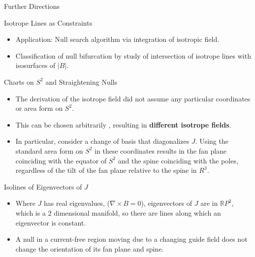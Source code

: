 \documentclass[final]{beamer}
\newlength{\sepwid}
\newlength{\onecolwid}
\newlength{\twocolwid}
\begin{document}
\begin{frame}[t]
\begin{columns}[t]
\begin{column}{\twocolwid}



\begin{columns}[t,totalwidth=\twocolwid]

\begin{column}{\onecolwid} %
\begin{block}{\huge Further Directions}
  \begin{block}{Isotrope Lines as Constraints}
    \begin{itemize}
      \item Application: Null search algorithm via integration of isotropic field.
      \item Classification of null bifurcation by study of intersection of isotrope lines
        with isosurfaces of $|B|$.
    \end{itemize}
  \end{block}

  \begin{block}{Charts on $S^2$ and Straightening Nulls}
    \begin{itemize}
      \item The derivation of the isotrope field did not assume
        any particular coordinates or area form on $S^2$.
      \item This can be chosen arbitrarily , resulting in \textbf{different isotrope fields}.
      \item In particular, consider a change of basis that diagonalizes $J$.
        Using the standard area form on $S^2$ in these coordinates results in the fan plane
        coinciding with the equator of $S^2$ and the spine coinciding with the poles,
        regardless of the tilt of the fan plane relative to the spine in $R^3$.
    \end{itemize}
  \end{block}

  \begin{block}{Isolines of Eigenvectors of $J$}
    \begin{itemize}
      \item Where $J$ has real eigenvalues, ($\nabla \times B=0$),
        eigenvectors of $J$ are in $\mathbb{R}P^2$, which is a 2 dimensional manifold,
        so there are lines along which an eigenvector is constant.
      \item A null in a current-free region
        moving due to a changing guide field does not change the orientation of
        its fan plane and spine.
    \end{itemize}
  \end{block}


\end{block}
\end{column}
\end{columns}
\end{column}
\end{columns}
\end{frame}
\end{document}
